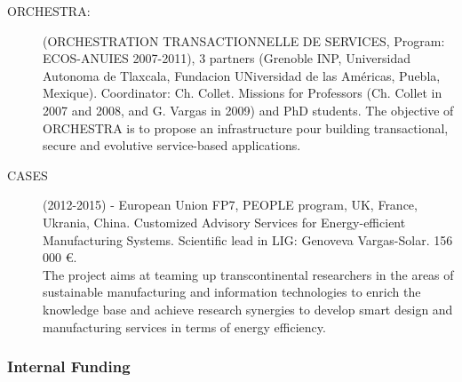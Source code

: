 \begin{description}
\item[ORCHESTRA:] (ORCHESTRATION TRANSACTIONNELLE DE SERVICES, Program: ECOS-ANUIES 2007-2011), 3 partners (Grenoble INP, Universidad Autonoma de Tlaxcala, Fundacion UNiversidad de las Am{\'e}ricas, Puebla, Mexique). Coordinator: Ch. Collet. 
Missions for Professors (Ch. Collet in 2007 and  2008, and G. Vargas in 2009) and PhD students. The objective of ORCHESTRA is to propose an infrastructure pour building transactional, secure and evolutive service-based applications. 

\item[CASES] (2012-2015) - European Union FP7, PEOPLE program, UK, France, Ukrania, China. Customized Advisory Services for Energy-efficient Manufacturing Systems. Scientific lead in LIG: Genoveva Vargas-Solar.  156 000 \euro.\\ The project aims at teaming up transcontinental researchers in the areas of sustainable manufacturing and information technologies to enrich the knowledge base and achieve research synergies to develop smart design and manufacturing services in terms of energy efficiency. 

\end{description}

\subsubsection{Internal Funding}

